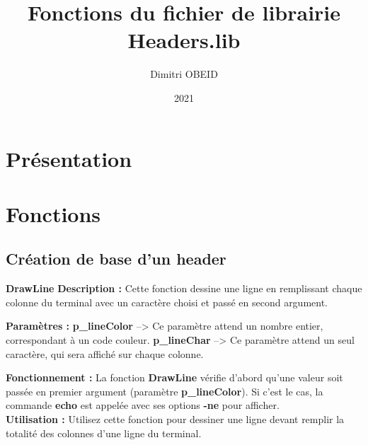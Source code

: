 \documentclass[a4paper,10pt]{article}
\title{Fonctions du fichier de librairie Headers.lib}
\author{Dimitri OBEID}
\date{2021}
\begin{document}
 \maketitle
 \tableofcontents
 \newpage

\color{red}
\section{Présentation}\color{white}

\color{red}
\section{Fonctions}\color{white}

\color{green}
\subsection{Création de base d'un header}\color{white}

\color{mauve}\textbf{DrawLine}\color{white}\linebreak
\textbf{Description :}\linebreak
Cette fonction dessine une ligne en remplissant chaque colonne du terminal avec un caractère choisi et passé en second argument.\linebreak

\textbf{Paramètres :}\linebreak
\color{orange}\textbf{p\_lineColor }\color{white} --> Ce paramètre attend un nombre entier, correspondant à un code couleur.\linebreak
\color{orange}\textbf{p\_lineChar }\color{white} --> Ce paramètre attend un seul caractère, qui sera affiché sur chaque colonne.\linebreak

\textbf{Fonctionnement :}\linebreak
La fonction \color{mauve}\textbf{DrawLine }\color{white} vérifie d'abord qu'une valeur soit passée en premier argument (paramètre \color{orange}\textbf{p\_lineColor}\color{white}). Si c'est le cas, la commande \color{gray}\textbf{echo }\color{white} est appelée avec ses options \color{gray}\textbf{-ne }\color{white} pour afficher.\\[1\baselineskip]

\textbf{Utilisation :}\linebreak
Utilisez cette fonction pour dessiner une ligne devant remplir la totalité des colonnes d'une ligne du terminal.\\[1\baselineskip]
\end{document}
